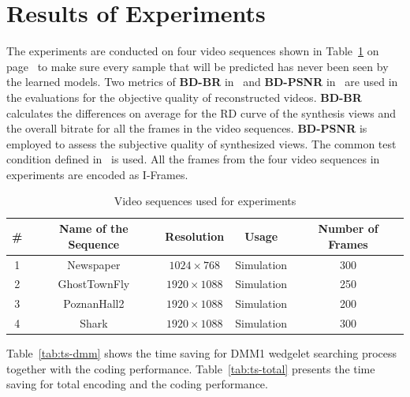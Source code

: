 \section{Results of Experiments}\label{sec:simu-results}
The experiments are conducted on four video sequences shown in
Table~\ref{tab:data-for-experiments} on
page~\pageref{tab:data-for-experiments} to make sure every sample
that will be predicted has never been seen by the learned models.
Two metrics of \textbf{BD-BR} in~\parencite{RN234} and \textbf{BD-PSNR}
in~\parencite{RN235}
are used in the evaluations for the objective quality
of reconstructed videos.
\textbf{BD-BR} calculates the differences on average for
the RD curve of the synthesis views and the overall bitrate 
for all the frames in the video sequences.
\textbf{BD-PSNR} is employed to assess the subjective 
quality of synthesized views.
The common test condition defined
in~\parencite{common-test-condition}
is used.
All the frames from the four video sequences in experiments 
are encoded as I-Frames.
\begin{table}[!htbp]
    \caption{Video sequences used for experiments}
    \bigskip\label{tab:data-for-experiments}
    \centering
    \begin{tabular}{c c c c c}
        \toprule
        \# & Name of the Sequence & Resolution & Usage & Number of Frames\\
        \midrule
        1 & Newspaper & \(1024\times768\) & Simulation & 300\\
        2 & GhostTownFly & \(1920\times1088\) & Simulation & 250\\
        3 & PoznanHall2 & \(1920\times1088\) & Simulation & 200\\
        4 & Shark & \(1920\times1088\) & Simulation & 300\\
        \bottomrule
    \end{tabular}
\end{table}

Table~\ref{tab:ts-dmm}
shows the time saving for DMM1 wedgelet searching process together 
with the coding performance.
Table~\ref{tab:ts-total}
presents the time saving for total encoding and the coding performance.

